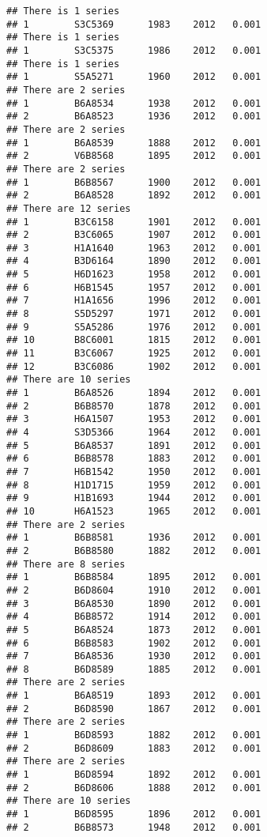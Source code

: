 \documentclass[]{article}
\begin{document}
\begin{verbatim}
## There is 1 series
## 1        S3C5369      1983    2012   0.001
## There is 1 series
## 1        S3C5375      1986    2012   0.001
## There is 1 series
## 1        S5A5271      1960    2012   0.001
## There are 2 series
## 1        B6A8534      1938    2012   0.001
## 2        B6A8523      1936    2012   0.001
## There are 2 series
## 1        B6A8539      1888    2012   0.001
## 2        V6B8568      1895    2012   0.001
## There are 2 series
## 1        B6B8567      1900    2012   0.001
## 2        B6A8528      1892    2012   0.001
## There are 12 series
## 1        B3C6158      1901    2012   0.001
## 2        B3C6065      1907    2012   0.001
## 3        H1A1640      1963    2012   0.001
## 4        B3D6164      1890    2012   0.001
## 5        H6D1623      1958    2012   0.001
## 6        H6B1545      1957    2012   0.001
## 7        H1A1656      1996    2012   0.001
## 8        S5D5297      1971    2012   0.001
## 9        S5A5286      1976    2012   0.001
## 10       B8C6001      1815    2012   0.001
## 11       B3C6067      1925    2012   0.001
## 12       B3C6086      1902    2012   0.001
## There are 10 series
## 1        B6A8526      1894    2012   0.001
## 2        B6B8570      1878    2012   0.001
## 3        H6A1507      1953    2012   0.001
## 4        S3D5366      1964    2012   0.001
## 5        B6A8537      1891    2012   0.001
## 6        B6B8578      1883    2012   0.001
## 7        H6B1542      1950    2012   0.001
## 8        H1D1715      1959    2012   0.001
## 9        H1B1693      1944    2012   0.001
## 10       H6A1523      1965    2012   0.001
## There are 2 series
## 1        B6B8581      1936    2012   0.001
## 2        B6B8580      1882    2012   0.001
## There are 8 series
## 1        B6B8584      1895    2012   0.001
## 2        B6D8604      1910    2012   0.001
## 3        B6A8530      1890    2012   0.001
## 4        B6B8572      1914    2012   0.001
## 5        B6A8524      1873    2012   0.001
## 6        B6B8583      1902    2012   0.001
## 7        B6A8536      1930    2012   0.001
## 8        B6D8589      1885    2012   0.001
## There are 2 series
## 1        B6A8519      1893    2012   0.001
## 2        B6D8590      1867    2012   0.001
## There are 2 series
## 1        B6D8593      1882    2012   0.001
## 2        B6D8609      1883    2012   0.001
## There are 2 series
## 1        B6D8594      1892    2012   0.001
## 2        B6D8606      1888    2012   0.001
## There are 10 series
## 1        B6D8595      1896    2012   0.001
## 2        B6B8573      1948    2012   0.001

\end{verbatim}
\end{document}
